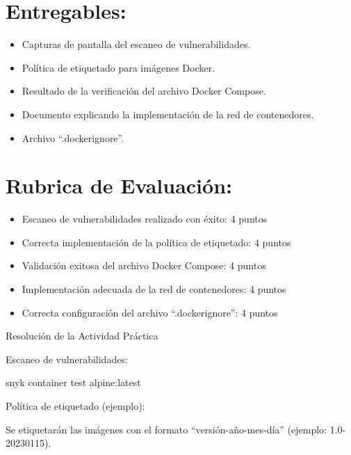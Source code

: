 \documentclass[
  a4paper,
  DIV=11,
  numbers=noendperiod,
  onepage,
  openany]{scrreprt}
\newenvironment{Shaded}{\begin{snugshade}}{\end{snugshade}}
\newcommand{\ExtensionTok}[1]{\textcolor[rgb]{0.00,0.23,0.31}{#1}}
\newcommand{\NormalTok}[1]{\textcolor[rgb]{0.00,0.23,0.31}{#1}}
\providecommand{\tightlist}{%
  \setlength{\itemsep}{0pt}\setlength{\parskip}{0pt}}\usepackage{longtable,booktabs,array}
\begin{document}
\hypertarget{entregables-4}{%
\section{Entregables:}\label{entregables-4}}

\begin{itemize}
\tightlist
\item
  Capturas de pantalla del escaneo de vulnerabilidades.
\item
  Política de etiquetado para imágenes Docker.
\item
  Resultado de la verificación del archivo Docker Compose.
\item
  Documento explicando la implementación de la red de contenedores.
\item
  Archivo ``.dockerignore''.
\end{itemize}

\hypertarget{rubrica-de-evaluaciuxf3n-4}{%
\section{Rubrica de Evaluación:}\label{rubrica-de-evaluaciuxf3n-4}}

\begin{itemize}
\tightlist
\item
  Escaneo de vulnerabilidades realizado con éxito: 4 puntos
\item
  Correcta implementación de la política de etiquetado: 4 puntos
\item
  Validación exitosa del archivo Docker Compose: 4 puntos
\item
  Implementación adecuada de la red de contenedores: 4 puntos
\item
  Correcta configuración del archivo ``.dockerignore'': 4 puntos
\end{itemize}

Resolución de la Actividad Práctica

Escaneo de vulnerabilidades:

\begin{Shaded}
\begin{Highlighting}[]
\ExtensionTok{snyk}\NormalTok{ container test alpine:latest}
\end{Highlighting}
\end{Shaded}

Política de etiquetado (ejemplo):

Se etiquetarán las imágenes con el formato ``versión-año-mes-día''
(ejemplo: 1.0-20230115).
\end{document}
